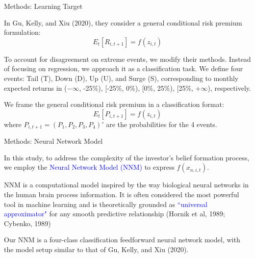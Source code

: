 \documentclass[11pt, aspectratio=169]{beamer}
\newenvironment{wideitemize}{\itemize\addtolength{\itemsep}{10pt}}{\enditemize}
\begin{document}
\begin{frame}{Methods: Learning Target}
    \bigskip
    \begin{wideitemize}
    \item In Gu, Kelly, and Xiu (2020), they consider a general conditional risk premium formulation:
    \begin{equation*}
        E_t[R_{i,t+1}] = f(z_{i,t})
    \end{equation*}
    \item To account for disagreement on extreme events, we modify their methods. \alert{Instead of focusing on regression, we approach it as a classification task}. We define four events: Tail (T), Down (D), Up (U), and Surge (S), corresponding to monthly expected returns in ($-\infty$, -25\%), [-25\%, 0\%), [0\%, 25\%), [25\%, $+\infty$), respectively.
    \item We frame the general conditional risk premium in a \alert{classification format}:
    \begin{equation*}
        E_t[P_{i,t+1}] = f(z_{i,t})
    \end{equation*}
    where $P_{i,t+1} =(P_{1},P_{2},P_{3},P_{4})'$ are the probabilities for the 4 events.
    \end{wideitemize}
\end{frame}

\begin{frame}{Methods: Neural Network Model}
    \bigskip
    \begin{wideitemize}
    \item In this study, to address the complexity of the investor's belief formation process, we employ the \textcolor{blue}{Neural Network Model (NNM)} to express $f(x_{n,i,t})$.
    \item NNM is a computational model inspired by the way \alert{biological neural networks} in the human brain process information. It is often considered the most powerful tool in machine learning and is theoretically grounded as \textcolor{blue}{``universal approximator"} for any smooth predictive relationship (Hornik et al, 1989; Cybenko, 1989)
    \item Our NNM is a \alert{four-class classification feedforward neural network model}, with the model setup similar to that of Gu, Kelly, and Xiu (2020). 
    \end{wideitemize}
\end{frame}
\end{document}

